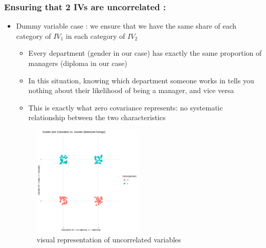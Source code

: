 \documentclass{article}
\begin{document}
\subsubsection{Ensuring that 2 IVs are uncorrelated :}
\begin{itemize}
    \item Dummy variable case : we ensure that we have the same share of each category of $IV_1$ in each category of $IV_2$
    \begin{infobox}
        \begin{itemize}
            \item Every department (gender in our case) has exactly the same proportion of managers (diploma in our case)
            \item In this situation, knowing which department someone works in tells you nothing about their likelihood of being a manager, and vice versa
            \item This is exactly what zero covariance represents: no systematic relationship between the two characteristics
        \end{itemize}
        \begin{figure}[H]
                \centering
                \includegraphics[width=0.5\textwidth]{example_correlation.png}
                \caption{visual representation of uncorrelated variables
                }
                \label{fig:visual representation of uncorrelated variables}
        \end{figure}
    \end{infobox}
\end{itemize}
\end{document}
